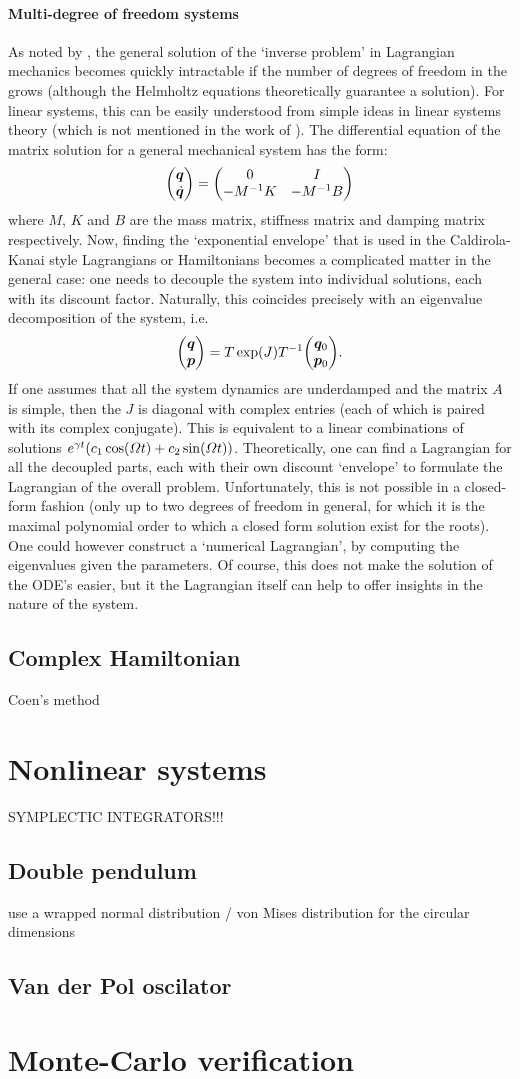 \paragraph{Multi-degree of freedom systems}
As noted by \citet{Udwadia2013}, the general solution of the `inverse problem' in Lagrangian mechanics becomes quickly intractable if the number of degrees of freedom in the grows (although the Helmholtz equations theoretically guarantee a solution). For linear systems, this can be easily understood from simple ideas in linear systems theory (which is not mentioned in the work of \citet{Udwadia2013}). The differential equation of the matrix solution for a general mechanical system has the form:
$$ \mqty(\vec{q}\\\vec{\dot{q}}) = \mqty(0 & I \\ -M^{-1}K & -M^{-1}B) $$
where $M$, $K$ and $B$ are the mass matrix, stiffness matrix and damping matrix respectively. Now, finding the `exponential envelope' that is used in the Caldirola-Kanai style Lagrangians or Hamiltonians becomes a complicated matter in the general case: one needs to decouple the system into individual solutions, each with its discount factor. Naturally, this coincides precisely with an eigenvalue decomposition of the system, i.e.
$$ \mqty(\vec{q}\\\vec{p}) = T\exp(J)T^{-1}\mqty(\vec{q}_0\\\vec{p}_0). $$
If one assumes that all the system dynamics are underdamped and the matrix $A$ is simple, then the $J$ is diagonal with complex entries (each of which is paired with its complex conjugate). This is equivalent to a linear combinations of solutions $e^{\gamma t}\qty(c_1\cos(\Omega t) + c_2\sin(\Omega t))$. Theoretically, one can find a Lagrangian for all the decoupled parts, each with their own discount `envelope' to formulate the Lagrangian of the overall problem. Unfortunately, this is not possible in a closed-form fashion (only up to two degrees of freedom in general, for which it is the maximal polynomial order to which a closed form solution exist for the roots). One could however construct a `numerical Lagrangian', by computing the eigenvalues given the parameters. Of course, this does not make the solution of the ODE's easier, but it the Lagrangian itself can help to offer insights in the nature of the system.

\subsection{Complex Hamiltonian}
Coen's method

\section{Nonlinear systems}
SYMPLECTIC INTEGRATORS!!!
\subsection{Double pendulum}
use a wrapped normal distribution / von Mises distribution for the circular dimensions


\subsection{Van der Pol oscilator}

\section{Monte-Carlo verification}

